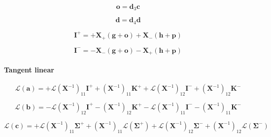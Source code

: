 \begin{equation}
\mathbf{o} = \mathbf{d}_{3}\mathbf{c}
\label{eq:mem-radiance_at_optical_depth-forward-o}
\end{equation}

\begin{equation}
\mathbf{d} = \mathbf{d}_{4}\mathbf{d}
\label{eq:mem-radiance_at_optical_depth-forward-p}
\end{equation}

\begin{equation}
\mathbf{I}^{+} = +\mathbf{X}_{+}(\mathbf{g} + \mathbf{o}) + \mathbf{X}_{-}(\mathbf{h} + \mathbf{p})
\label{eq:mem-radiance_at_optical_depth-forward-I_p}
\end{equation}

\begin{equation}
\mathbf{I}^{-} = -\mathbf{X}_{-}(\mathbf{g} + \mathbf{o}) - \mathbf{X}_{+}(\mathbf{h} + \mathbf{p})
\label{eq:mem-radiance_at_optical_depth-forward-I_m}
\end{equation}


%
\paragraph{Tangent linear}
\label{sec:mem-radiance_at_optical_depth-tangent_linear}

\begin{equation}
\mathcal{L}(\mathbf{a}) = +\mathcal{L}(\mathbf{X}^{-1})_{11}\mathbf{I}^{+} + (\mathbf{X}^{-1})_{11}\mathbf{K}^{+} + \mathcal{L}(\mathbf{X}^{-1})_{12}\mathbf{I}^{-} + (\mathbf{X}^{-1})_{12}\mathbf{K}^{-}
\label{eq:mem-radiance_at_optical_depth-tangent_linear-a_l}
\end{equation}

\begin{equation}
\mathcal{L}(\mathbf{b}) = -\mathcal{L}(\mathbf{X}^{-1})_{12}\mathbf{I}^{+} - (\mathbf{X}^{-1})_{12}\mathbf{K}^{+} - \mathcal{L}(\mathbf{X}^{-1})_{11}\mathbf{I}^{-} - (\mathbf{X}^{-1})_{11}\mathbf{K}^{-}
\label{eq:mem-radiance_at_optical_depth-tangent_linear-b_l}
\end{equation}

\begin{equation}
\mathcal{L}(\mathbf{c}) = +\mathcal{L}(\mathbf{X}^{-1})_{11}\mathbf{\Sigma}^{+} + (\mathbf{X}^{-1})_{11}\mathcal{L}(\mathbf{\Sigma}^{+}) + \mathcal{L}(\mathbf{X}^{-1})_{12}\mathbf{\Sigma}^{-} + (\mathbf{X}^{-1})_{12}\mathcal{L}(\mathbf{\Sigma}^{-})
\label{eq:mem-radiance_at_optical_depth-tangent_linear-c_l}
\end{equation}

